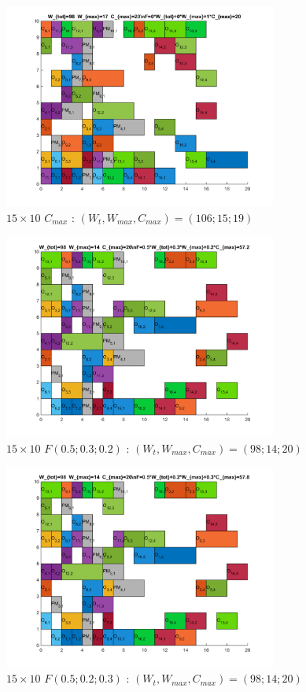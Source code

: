 \documentclass[10pt,a4paper]{scrartcl}
\begin{document}
\begin{figure}
  \centering
  \includegraphics[width=0.8\textwidth]{img/results15x10_Cmax.png}
  \caption{$15 \times 10$ $C_{max}$ : $(W_t, W_{max}, C_{max}) = (106; 15; 19)$}
\end{figure}
\begin{figure}
  \centering
  \includegraphics[width=0.8\textwidth]{img/results15x10_F050302.png}
  \caption{$15 \times 10$ $F(0.5;0.3;0.2)$ : $(W_t, W_{max}, C_{max}) = (98; 14; 20)$}
\end{figure}
\begin{figure}
  \centering
  \includegraphics[width=0.8\textwidth]{img/results15x10_F050203.png}
  \caption{$15 \times 10$ $F(0.5;0.2;0.3)$ : $(W_t, W_{max}, C_{max}) = (98; 14; 20)$}
\end{figure}
\end{document}
